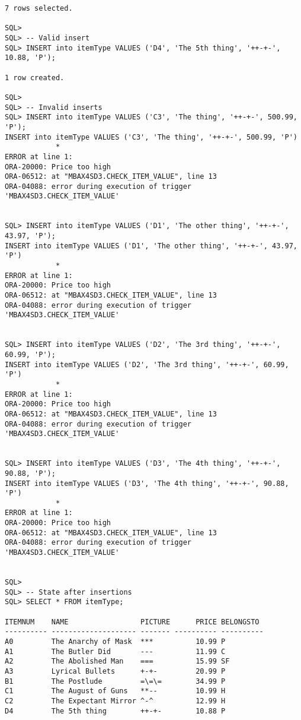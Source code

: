 \documentclass{article}
\begin{document}
\begin{lstlisting}
7 rows selected.

SQL> 
SQL> -- Valid insert
SQL> INSERT into itemType VALUES ('D4', 'The 5th thing', '++-+-', 10.88, 'P');

1 row created.

SQL> 
SQL> -- Invalid inserts
SQL> INSERT into itemType VALUES ('C3', 'The thing', '++-+-', 500.99, 'P');
INSERT into itemType VALUES ('C3', 'The thing', '++-+-', 500.99, 'P')
            *
ERROR at line 1:
ORA-20000: Price too high 
ORA-06512: at "MBAX4SD3.CHECK_ITEM_VALUE", line 13 
ORA-04088: error during execution of trigger 'MBAX4SD3.CHECK_ITEM_VALUE' 


SQL> INSERT into itemType VALUES ('D1', 'The other thing', '++-+-', 43.97, 'P');
INSERT into itemType VALUES ('D1', 'The other thing', '++-+-', 43.97, 'P')
            *
ERROR at line 1:
ORA-20000: Price too high 
ORA-06512: at "MBAX4SD3.CHECK_ITEM_VALUE", line 13 
ORA-04088: error during execution of trigger 'MBAX4SD3.CHECK_ITEM_VALUE' 


SQL> INSERT into itemType VALUES ('D2', 'The 3rd thing', '++-+-', 60.99, 'P');
INSERT into itemType VALUES ('D2', 'The 3rd thing', '++-+-', 60.99, 'P')
            *
ERROR at line 1:
ORA-20000: Price too high 
ORA-06512: at "MBAX4SD3.CHECK_ITEM_VALUE", line 13 
ORA-04088: error during execution of trigger 'MBAX4SD3.CHECK_ITEM_VALUE' 


SQL> INSERT into itemType VALUES ('D3', 'The 4th thing', '++-+-', 90.88, 'P');
INSERT into itemType VALUES ('D3', 'The 4th thing', '++-+-', 90.88, 'P')
            *
ERROR at line 1:
ORA-20000: Price too high 
ORA-06512: at "MBAX4SD3.CHECK_ITEM_VALUE", line 13 
ORA-04088: error during execution of trigger 'MBAX4SD3.CHECK_ITEM_VALUE' 


SQL> 
SQL> -- State after insertions
SQL> SELECT * FROM itemType;

ITEMNUM    NAME                 PICTURE      PRICE BELONGSTO                    
---------- -------------------- ------- ---------- ----------                   
A0         The Anarchy of Mask  ***          10.99 P                            
A1         The Butler Did       ---          11.99 C                            
A2         The Abolished Man    ===          15.99 SF                           
A3         Lyrical Bullets      +-+-         20.99 P                            
B1         The Postlude         =\=\=        34.99 P                            
C1         The August of Guns   **--         10.99 H                            
C2         The Expectant Mirror ^-^          12.99 H                            
D4         The 5th thing        ++-+-        10.88 P                            


\end{lstlisting}
\end{document}
